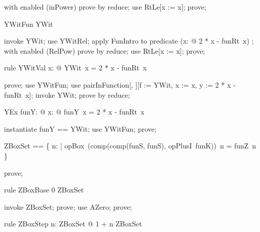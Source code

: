 \documentclass{article}
\begin{document}
\begin{zproof}
with enabled (inPower) prove by reduce;
use RtLe[x := x];
prove;
\end{zproof}

\begin{theorem}{YWitFun}
  YWit \in \nat \fun \nat
\end{theorem}

\begin{zproof}
invoke YWit;
use YWitRel;
apply FunIntro to predicate (\lambda x: \nat @ 2 * x - funRt~x) \in \nat \fun \nat;
with enabled (RelPow) prove by reduce;
use RtLe[x := x];
prove;
\end{zproof}

\begin{theorem}{rule YWitVal}
  \forall x: \nat @ YWit~x = 2 * x - funRt~x
\end{theorem}

\begin{zproof}
prove;
use YWitFun;
use pairInFunction[\nat, \nat][f := YWit, x := x, y := 2 * x - funRt~x];
invoke YWit;
prove by reduce;
\end{zproof}

\begin{theorem}{YEx}
  \exists funY: \nat \fun \nat @ \forall x: \nat @ funY~x = 2 * x - funRt~x
\end{theorem}

\begin{zproof}
instantiate funY == YWit;
use YWitFun;
prove;
\end{zproof}

\begin{zed}
  ZBoxSet == \{ n: \nat | opBox~(comp(comp(funS, funS), opPlusI~funK))~n = funZ~n \}
\end{zed}

\begin{zproof}
prove;
\end{zproof}

\begin{theorem}{rule ZBoxBase}
  0 \in ZBoxSet
\end{theorem}

\begin{zproof}
invoke ZBoxSet;
prove;
use AZero;
prove;
\end{zproof}

\begin{theorem}{rule ZBoxStep}
  \forall n: ZBoxSet @ 1 + n \in ZBoxSet
\end{theorem}
\end{document}
